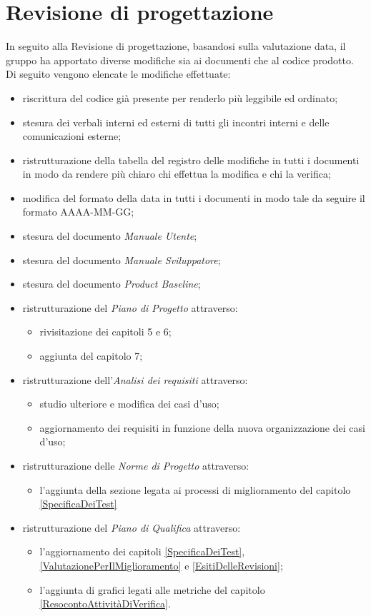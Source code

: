 \section{Revisione di progettazione}\label{EsitiDelleRevisioniRevisioneDiProgettazione}

In seguito alla Revisione di progettazione, basandosi sulla valutazione data, il gruppo ha apportato diverse modifiche sia ai documenti che al codice prodotto. Di seguito vengono elencate le modifiche effettuate:
\begin{itemize}
	\item riscrittura del codice già presente per renderlo più leggibile ed ordinato;
	\item stesura dei verbali interni ed esterni di tutti gli incontri interni e delle comunicazioni esterne;
	\item ristrutturazione della tabella del registro delle modifiche in tutti i documenti in modo da rendere più chiaro chi effettua la modifica e chi la verifica;
	\item modifica del formato della data in tutti i documenti in modo tale da seguire il formato AAAA-MM-GG;
	\item stesura del documento \textit{Manuale Utente};
	\item stesura del documento \textit{Manuale Sviluppatore};
	\item stesura del documento \textit{Product Baseline};
	\item ristrutturazione del \textit{Piano di Progetto} attraverso:
	\begin{itemize}
		\item rivisitazione dei capitoli 5 e 6;
		\item aggiunta del capitolo 7;
	\end{itemize}
	\item ristrutturazione dell'\textit{Analisi dei requisiti} attraverso:
	\begin{itemize}
		\item studio ulteriore e modifica dei casi d'uso;
		\item aggiornamento dei requisiti in funzione della nuova organizzazione dei casi d'uso;
	\end{itemize}
	\item ristrutturazione delle \textit{Norme di Progetto} attraverso:
	\begin{itemize}
		\item l'aggiunta della sezione legata ai processi di miglioramento del capitolo \ref{SpecificaDeiTest}
	\end{itemize}
	\item ristrutturazione del \textit{Piano di Qualifica} attraverso:
	\begin{itemize}
		\item l'aggiornamento dei capitoli \ref{SpecificaDeiTest}, \ref{ValutazionePerIlMiglioramento} e \ref{EsitiDelleRevisioni};
		\item l'aggiunta di grafici legati alle metriche del capitolo \ref{ResocontoAttivitàDiVerifica}.
	\end{itemize}
\end{itemize}